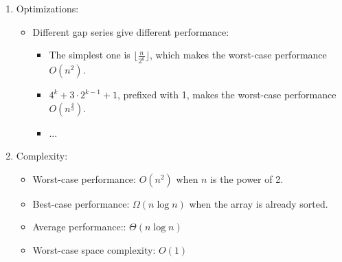 \documentclass[12pt]{article}
\begin{document}
\begin{enumerate}
\begin{itemize}
        \end{itemize}
        \item Optimizations:
        \begin{itemize}
            \item Different gap series give different performance:
            \begin{itemize}
                \item The simplest one is $\lfloor \frac{n}{2^k}\rfloor$, which makes the worst-case performance $O(n^2)$.
                \item $4^k+3\cdot 2^{k-1}+1$, prefixed with 1, makes the worst-case performance $O(n^{\frac{4}{3}})$.
                \item ...
            \end{itemize}
        \end{itemize}
        \item Complexity:
        \begin{itemize}
            \item Worst-case performance: $O(n^2)$ when $n$ is the power of 2.
            \item Best-case performance: $\Omega(n\log n)$ when the array is already sorted.
            \item Average performance:: $\Theta(n\log n)$
            \item Worst-case space complexity: $O(1)$
        \end{itemize}
    \end{enumerate}
\end{document}
